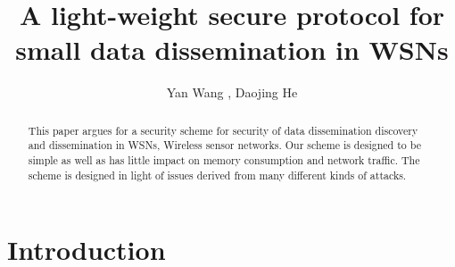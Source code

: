 \documentclass[lnicst,sechang,a4paper]{svmultln}
\begin{document}
\mainmatter  %

\title{A light-weight secure protocol for small data dissemination in WSNs}


%
%
\author{Yan Wang%
, Daojing He \Envelope
}  %


%
%

\maketitle


\begin{abstract}


This paper argues for a security scheme for security of data dissemination discovery and dissemination in WSNs, Wireless sensor networks. Our scheme is designed to be simple as well as has little impact on memory consumption and network traffic. The scheme is designed in light of issues derived from many different kinds of attacks.

\end{abstract}
\section{Introduction}
\end{document}
